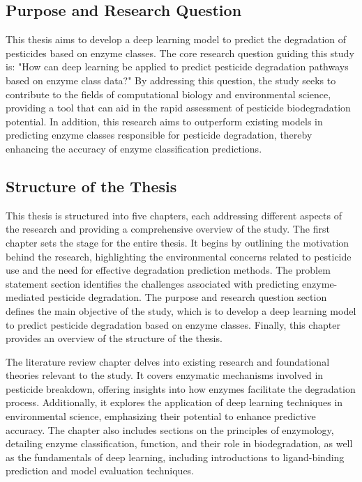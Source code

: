 \subsection{Purpose and Research Question}
\label{sec:Objective}

This thesis aims to develop a deep learning model to predict the degradation of pesticides based on enzyme classes. The core research question guiding this study is: "How can deep learning be applied to predict pesticide degradation pathways based on enzyme class data?" By addressing this question, the study seeks to contribute to the fields of computational biology and environmental science, providing a tool that can aid in the rapid assessment of pesticide biodegradation potential. In addition, this research aims to outperform existing models in predicting enzyme classes responsible for pesticide degradation, thereby enhancing the accuracy of enzyme classification predictions.


\subsection{Structure of the Thesis}
\label{sec:Structure of the Thesis}
This thesis is structured into five chapters, each addressing different aspects of the research and providing a comprehensive overview of the study.
The first chapter sets the stage for the entire thesis. It begins by outlining the motivation behind the research, highlighting the environmental concerns related to pesticide use and the need for effective degradation prediction methods. The problem statement section identifies the challenges associated with predicting enzyme-mediated pesticide degradation. The purpose and research question section defines the main objective of the study, which is to develop a deep learning model to predict pesticide degradation based on enzyme classes. Finally, this chapter provides an overview of the structure of the thesis.

The literature review chapter delves into existing research and foundational theories relevant to the study. It covers enzymatic mechanisms involved in pesticide breakdown, offering insights into how enzymes facilitate the degradation process. Additionally, it explores the application of deep learning techniques in environmental science, emphasizing their potential to enhance predictive accuracy. The chapter also includes sections on the principles of enzymology, detailing enzyme classification, function, and their role in biodegradation, as well as the fundamentals of deep learning, including introductions to ligand-binding prediction and model evaluation techniques.

